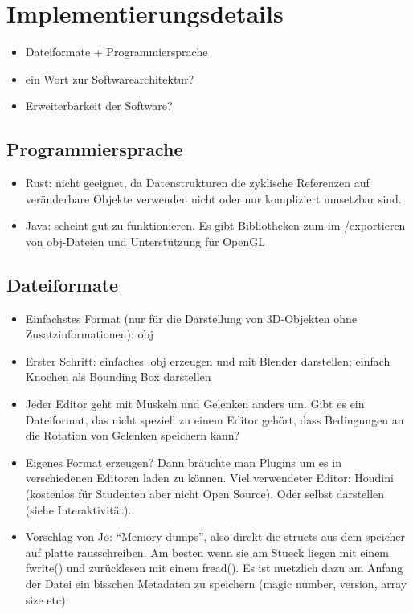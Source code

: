 \chapter{Implementierungsdetails}
\label{chapter_implementation_detail}

\begin{itemize}
 \item Dateiformate + Programmiersprache
 \item ein Wort zur Softwarearchitektur?
 \item Erweiterbarkeit der Software?
\end{itemize}


\section{Programmiersprache}

\begin{itemize}
 \item Rust: nicht geeignet, da Datenstrukturen die zyklische Referenzen auf veränderbare Objekte verwenden nicht oder nur kompliziert umsetzbar sind.
 \item Java: scheint gut zu funktionieren. Es gibt Bibliotheken zum im-/exportieren von obj-Dateien und Unterstützung für OpenGL
\end{itemize}


\section{Dateiformate}

\begin{itemize}
 \item Einfachstes Format (nur für die Darstellung von 3D-Objekten ohne Zusatzinformationen): obj
 \item Erster Schritt: einfaches .obj erzeugen und mit Blender darstellen; einfach Knochen als Bounding Box darstellen
 \item Jeder Editor geht mit Muskeln und Gelenken anders um. Gibt es ein Dateiformat, das nicht speziell zu einem Editor gehört, dass Bedingungen an die Rotation von Gelenken speichern kann?
 \item Eigenes Format erzeugen? Dann bräuchte man Plugins um es in verschiedenen Editoren laden zu können. Viel verwendeter Editor: Houdini (kostenlos für Studenten aber nicht Open Source). Oder selbst darstellen (siehe Interaktivität).
\item Vorschlag von Jo: "`Memory dumps"', also direkt die structs aus dem speicher auf platte rausschreiben. Am besten wenn sie am Stueck liegen mit einem fwrite() und zurücklesen mit einem fread(). Es ist nuetzlich dazu am Anfang der Datei ein bisschen Metadaten zu speichern (magic number, version, array size etc).
\end{itemize}

